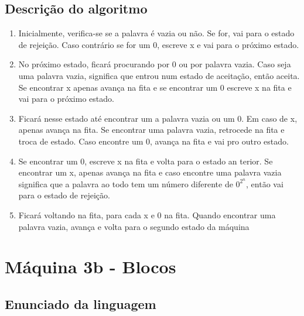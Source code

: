 \documentclass{article}
\begin{document}
    \subsection{Descrição do algoritmo}
    \begin{enumerate}
        \item Inicialmente, verifica-se se a palavra é vazia ou não.
        Se for, vai para o estado de rejeição. Caso contrário se for
        um 0, escreve x e vai para o próximo estado.
        \item No próximo estado, ficará procurando por 0 ou por palavra
        vazia. Caso seja uma palavra vazia, significa que entrou num estado
        de aceitação, então aceita. Se encontrar x apenas avança na fita
        e se encontrar um 0 escreve x na fita e vai para o próximo estado.
        \item Ficará nesse estado até encontrar um a palavra vazia ou 
        um 0. Em caso de x, apenas avança na fita. Se encontrar uma palavra
        vazia, retrocede na fita e troca de estado. Caso encontre um 0,
        avança na fita e vai pro outro estado.
        \item Se encontrar um 0, escreve x na fita e volta para o estado an
        terior. Se encontrar um x, apenas avança na fita e caso encontre
        uma palavra vazia significa que a palavra ao todo tem um número
        diferente de $0^{2}^{n}$, então vai para o estado de rejeição.
        \item Ficará voltando na fita, para cada x e 0 na fita. Quando
        encontrar uma palavra vazia, avança e volta para o segundo 
        estado da máquina
    \end{enumerate}
\section{Máquina 3b - Blocos}
    \subsection{Enunciado da linguagem}
\end{document}
